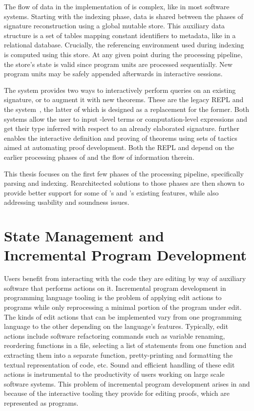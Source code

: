 The flow of data in the implementation of \Beluga is complex, like in most software systems.
Starting with the indexing phase, data is shared between the phases of signature reconstruction using a global mutable store.
This auxiliary data structure is a set of tables mapping constant identifiers to metadata, like in a relational database.
Crucially, the referencing environment used during indexing is computed using this store.
At any given point during the processing pipeline, the store's state is valid since program units are processed sequentially.
New program units may be safely appended afterwards in interactive sessions.

The \Beluga system provides two ways to interactively perform queries on an existing \Beluga signature, or to augment it with new theorems.
These are the legacy \ac{REPL} and the \Harpoon system~\cite{errington2021harpoon}, the latter of which is designed as a replacement for the former.
Both systems allow the user to input \LF-level terms or computation-level expressions and get their type inferred with respect to an already elaborated \Beluga signature.
\Harpoon further enables the interactive definition and proving of theorems using sets of tactics aimed at automating proof development.
Both the \ac{REPL} and \Harpoon depend on the earlier processing phases of \Beluga and the flow of information therein.

This thesis focuses on the first few phases of the \Beluga processing pipeline, specifically parsing and indexing.
Rearchitected solutions to those phases are then shown to provide better support for some of \Beluga's and \Harpoon's existing features, while also addressing usability and soundness issues.

\section{State Management and Incremental Program Development}\label{section:intro-state-management}

Users benefit from interacting with the code they are editing by way of auxiliary software that performs actions on it.
Incremental program development in programming language tooling is the problem of applying edit actions to programs while only reprocessing a minimal portion of the program under edit.
The kinds of edit actions that can be implemented vary from one programming language to the other depending on the language's features.
Typically, edit actions include software refactoring commands such as variable renaming, reordering functions in a file, selecting a list of statements from one function and extracting them into a separate function, pretty-printing and formatting the textual representation of code, etc.
Sound and efficient handling of these edit actions is instrumental to the productivity of users working on large scale software systems.
This problem of incremental program development arises in \Beluga and \Harpoon because of the interactive tooling they provide for editing proofs, which are represented as programs.

